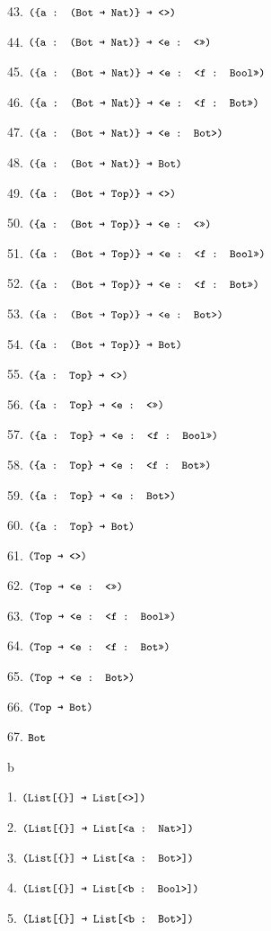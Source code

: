 \documentclass[dvipsnames]{article}
\let\codeOrig\code
\renewcommand{\code}[2][]{%
  \ifmmode
    \if\relax\detokenize{#1}\relax
      \mathchoice{\mbox{\normalfont\small\ttfamily #2}}{\mbox{\normalfont\small\ttfamily #2}}{\mbox{\normalfont\small\ttfamily #2}}{\mbox{\normalfont\small\ttfamily #2}}%
    \else
      \mathchoice{\mbox{\normalfont\small\ttfamily #2}}{\mbox{\normalfont\small\ttfamily #2}}{\mbox{\normalfont\small\ttfamily #2}}{\mbox{\normalfont\small\ttfamily #2}}%
    \fi
  \else
    \codeOrig[#1]{#2}%
  \fi}
\begin{document}
\begin{enumerate}
      43. $\code{(\{a : (Bot → Nat)\} → <>)}$

      44. $\code{(\{a : (Bot → Nat)\} → <e : <>>)}$

      45. $\code{(\{a : (Bot → Nat)\} → <e : <f : Bool>>)}$

      46. $\code{(\{a : (Bot → Nat)\} → <e : <f : Bot>>)}$

      47. $\code{(\{a : (Bot → Nat)\} → <e : Bot>)}$

      48. $\code{(\{a : (Bot → Nat)\} → Bot)}$

      49. $\code{(\{a : (Bot → Top)\} → <>)}$

      50. $\code{(\{a : (Bot → Top)\} → <e : <>>)}$

      51. $\code{(\{a : (Bot → Top)\} → <e : <f : Bool>>)}$

      52. $\code{(\{a : (Bot → Top)\} → <e : <f : Bot>>)}$

      53. $\code{(\{a : (Bot → Top)\} → <e : Bot>)}$

      54. $\code{(\{a : (Bot → Top)\} → Bot)}$

      55. $\code{(\{a : Top\} → <>)}$

      56. $\code{(\{a : Top\} → <e : <>>)}$

      57. $\code{(\{a : Top\} → <e : <f : Bool>>)}$

      58. $\code{(\{a : Top\} → <e : <f : Bot>>)}$

      59. $\code{(\{a : Top\} → <e : Bot>)}$

      60. $\code{(\{a : Top\} → Bot)}$

      61. $\code{(Top → <>)}$

      62. $\code{(Top → <e : <>>)}$

      63. $\code{(Top → <e : <f : Bool>>)}$

      64. $\code{(Top → <e : <f : Bot>>)}$

      65. $\code{(Top → <e : Bot>)}$

      66. $\code{(Top → Bot)}$

      67. $\code{Bot}$

    b

      1. $\code{(List[\{\}] → List[<>])}$

      2. $\code{(List[\{\}] → List[<a : Nat>])}$

      3. $\code{(List[\{\}] → List[<a : Bot>])}$

      4. $\code{(List[\{\}] → List[<b : Bool>])}$

      5. $\code{(List[\{\}] → List[<b : Bot>])}$


\end{enumerate}
\end{document}
